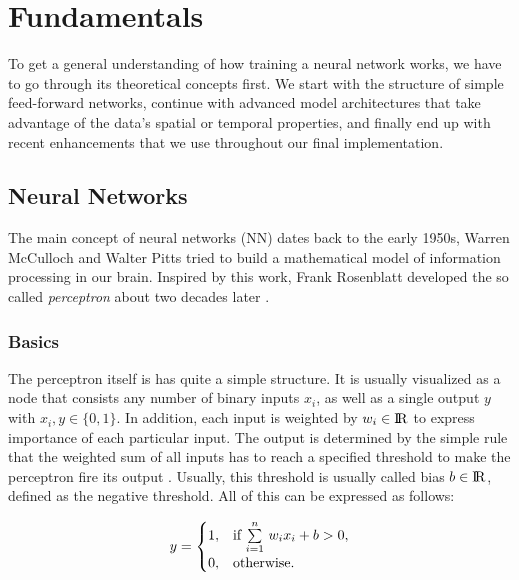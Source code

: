 
\chapter{Fundamentals} \label{chapter:fundamentals}

To get a general understanding of how training a neural network works, we have to go through its theoretical concepts first. We start with the structure of simple feed-forward networks, continue with advanced model architectures that take advantage of the data's spatial or temporal properties, and finally end up with recent enhancements that we use throughout our final implementation.


\section{Neural Networks}

The main concept of neural networks (NN) dates back to the early 1950s, Warren McCulloch and Walter Pitts tried to build a mathematical model of information processing in our brain. Inspired by this work, Frank Rosenblatt developed the so called \textit{perceptron} about two decades later \parencite[p. 226]{pattern_and_ml}. 

\subsection{Basics}

The perceptron itself is has quite a simple structure. It is usually visualized as a node that consists any number of binary inputs $ x_{i} $, as well as a single output $ y $ with $ x_{i}, y \in \{0, 1\} $. In addition, each input is weighted by $ w_{i} \in \rm I\!R $ to express importance of each particular input. The output is determined by the simple rule that the weighted sum of all inputs has to reach a specified threshold to make the perceptron fire its output \parencite{neural_nets_deep_learning}. Usually, this threshold is usually called bias $ b \in \rm I\!R $, defined as the negative threshold. All of this can be expressed as follows:

\begin{equation} \label{eq:mlp}
  y = \begin{cases}
    1, & \text{if $ \sum\limits_{i=1}^n \, w_{i}x_{i} + b > 0$},\\
    0, & \text{otherwise}.
  \end{cases}
\end{equation}

